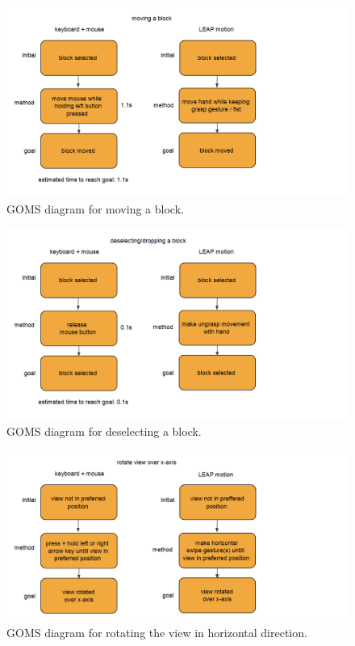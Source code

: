 \begin{appendix}
\begin{figure}[!htbp]
\includegraphics[width=\textwidth]{imgs/movingblock.png}
\caption{GOMS diagram for moving a block.}
\label{fig:movingblock}
\end{figure}

\begin{figure}[!htbp]
\includegraphics[width=\textwidth]{imgs/deselectingblocks.png}
\caption{GOMS diagram for deselecting a block.}
\label{fig:deselectingblocks}
\end{figure}

\begin{figure}[!htbp]
\includegraphics[width=\textwidth]{imgs/rotateviewx.png}
\caption{GOMS diagram for rotating the view in horizontal direction.}
\label{fig:rotateviewx}
\end{figure}


\end{appendix}
